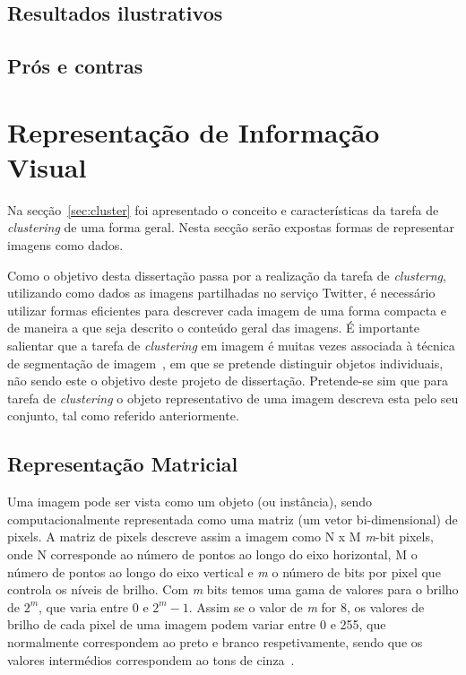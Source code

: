 \subsection{Resultados ilustrativos}



\subsection{Prós e contras}




\section{Representação de Informação Visual} \label{sec:represent}

Na secção~\ref{sec:cluster} foi apresentado o conceito e características da tarefa de \textit{clustering} de uma forma geral. Nesta secção serão expostas formas de representar imagens como dados. 

Como o objetivo desta dissertação passa por a realização da tarefa de \textit{clusterng}, utilizando como dados as imagens partilhadas no serviço Twitter, é necessário utilizar formas eficientes para descrever cada imagem de uma forma compacta e de maneira a que seja descrito o conteúdo geral das imagens. É importante salientar que a tarefa de \textit{clustering} em imagem é muitas vezes associada à técnica de segmentação de imagem~\citet{Forsyth2011}, em que se pretende distinguir objetos individuais, não sendo este o objetivo deste projeto de dissertação. Pretende-se sim que para tarefa de \textit{clustering} o objeto representativo de uma imagem descreva esta pelo seu conjunto, tal como referido anteriormente. 

\subsection{Representação Matricial} \label{subsec:matrix}

Uma imagem pode ser vista como um objeto (ou instância), sendo computacionalmente representada como uma matriz (um vetor bi-dimensional) de pixels. A matriz de pixels descreve assim a imagem como N x M \textit{m}-bit pixels, onde N corresponde ao número de pontos ao longo do eixo horizontal, M o número de pontos ao longo do eixo vertical e \textit{m} o número de bits por pixel que controla os níveis de brilho. Com \textit{m} bits temos uma gama de valores para o brilho de $ 2^m $, que varia entre 0 e $ 2^m - 1 $. Assim se o valor de \textit{m} for 8, os valores de brilho de cada pixel de uma imagem podem variar entre 0 e 255, que normalmente correspondem ao preto e branco respetivamente, sendo que os valores intermédios correspondem ao tons de cinza~\citet{Nixon2002}.

